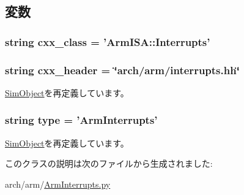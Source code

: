 \subsection{変数}
\hypertarget{classArmInterrupts_1_1ArmInterrupts_a58cd55cd4023648e138237cfc0822ae3}{
\subsubsection[{cxx\_\-class}]{\setlength{\rightskip}{0pt plus 5cm}string {\bf cxx\_\-class} = '{\bf ArmISA::Interrupts}'}}
\label{classArmInterrupts_1_1ArmInterrupts_a58cd55cd4023648e138237cfc0822ae3}
\hypertarget{classArmInterrupts_1_1ArmInterrupts_a17da7064bc5c518791f0c891eff05fda}{
\subsubsection[{cxx\_\-header}]{\setlength{\rightskip}{0pt plus 5cm}string {\bf cxx\_\-header} = \char`\"{}arch/arm/interrupts.hh\char`\"{}}}
\label{classArmInterrupts_1_1ArmInterrupts_a17da7064bc5c518791f0c891eff05fda}


\hyperlink{classm5_1_1SimObject_1_1SimObject_a17da7064bc5c518791f0c891eff05fda}{SimObject}を再定義しています。\hypertarget{classArmInterrupts_1_1ArmInterrupts_acce15679d830831b0bbe8ebc2a60b2ca}{
\subsubsection[{type}]{\setlength{\rightskip}{0pt plus 5cm}string {\bf type} = '{\bf ArmInterrupts}'}}
\label{classArmInterrupts_1_1ArmInterrupts_acce15679d830831b0bbe8ebc2a60b2ca}


\hyperlink{classm5_1_1SimObject_1_1SimObject_acce15679d830831b0bbe8ebc2a60b2ca}{SimObject}を再定義しています。

このクラスの説明は次のファイルから生成されました:\begin{DoxyCompactItemize}
\item 
arch/arm/\hyperlink{ArmInterrupts_8py}{ArmInterrupts.py}\end{DoxyCompactItemize}
